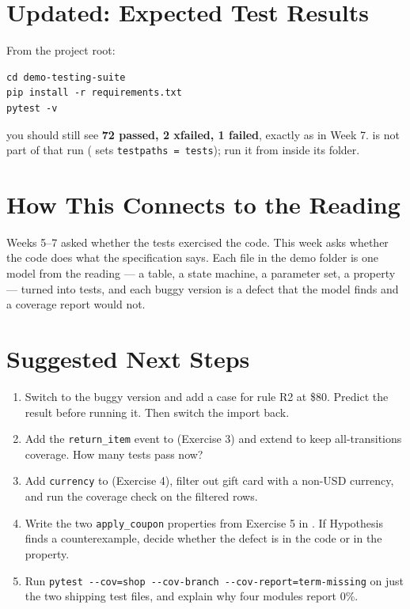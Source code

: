 \documentclass[11pt]{article}
\begin{document}
\section{Updated: Expected Test Results}
From the project root:
\begin{lstlisting}[style=shellstyle]
cd demo-testing-suite
pip install -r requirements.txt
pytest -v
\end{lstlisting}
you should still see \textbf{72 passed, 2 xfailed, 1 failed}, exactly
as in Week 7.  is not part of that run
( sets \texttt{testpaths = tests}); run it from inside
its folder.

\section{How This Connects to the Reading}
\begin{keyidea}
Weeks 5--7 asked whether the tests exercised the code. This week asks
whether the code does what the specification says. Each file in the
demo folder is one model from the reading --- a table, a state machine,
a parameter set, a property --- turned into tests, and each buggy
version is a defect that the model finds and a coverage report would
not.
\end{keyidea}

\section{Suggested Next Steps}
\begin{enumerate}
\item Switch  to the buggy version and
add a case for rule R2 at \$80. Predict the result before running it.
Then switch the import back.
\item Add the \texttt{return\_item} event to 
(Exercise 3) and extend  to keep
all-transitions coverage. How many tests pass now?
\item Add \texttt{currency} to  (Exercise 4), filter
out gift card with a non-USD currency, and run the coverage check on
the filtered rows.
\item Write the two \texttt{apply\_coupon} properties from Exercise 5 in
. If Hypothesis finds a counterexample,
decide whether the defect is in the code or in the property.
\item Run
\texttt{pytest -{}-cov=shop -{}-cov-branch -{}-cov-report=term-missing}
on just the two shipping test files, and explain why four
 modules report 0\%.
\end{enumerate}
\end{document}
